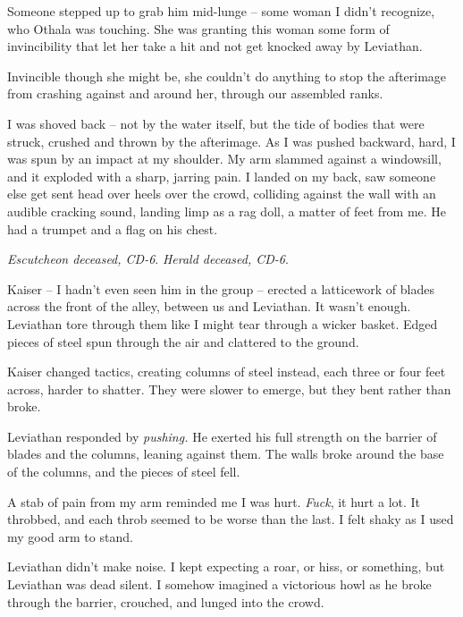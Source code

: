 Someone stepped up to grab him mid-lunge – some woman I didn't recognize, who Othala was touching.  She was granting this woman some form of invincibility that let her take a hit and not get knocked away by Leviathan.



Invincible though she might be, she couldn't do anything to stop the afterimage from crashing against and around her, through our assembled ranks.



I was shoved back – not by the water itself, but the tide of bodies that were struck, crushed and thrown by the afterimage.  As I was pushed backward, hard, I was spun by an impact at my shoulder.  My arm slammed against a windowsill, and it exploded with a sharp, jarring pain.  I landed on my back, saw someone else get sent head over heels over the crowd, colliding against the wall with an audible cracking sound, landing limp as a rag doll, a matter of feet from me.  He had a trumpet and a flag on his chest.



\emph{Escutcheon deceased, CD-6}.  \emph{Herald deceased, CD-6}.



Kaiser – I hadn't even seen him in the group – erected a latticework of blades across the front of the alley, between us and Leviathan.  It wasn't enough.  Leviathan tore through them like I might tear through a wicker basket.  Edged pieces of steel spun through the air and clattered to the ground.



Kaiser changed tactics, creating columns of steel instead, each three or four feet across, harder to shatter.  They were slower to emerge, but they bent rather than broke.



Leviathan responded by \emph{pushing.  }He exerted his full strength on the barrier of blades and the columns, leaning against them.  The walls broke around the base of the columns, and the pieces of steel fell.



A stab of pain from my arm reminded me I was hurt.\emph{  Fuck}, it hurt a lot.  It throbbed, and each throb seemed to be worse than the last.  I felt shaky as I used my good arm to stand.



Leviathan didn't make noise.  I kept expecting a roar, or hiss, or something, but Leviathan was dead silent.  I somehow imagined a victorious howl as he broke through the barrier, crouched, and lunged into the crowd.



